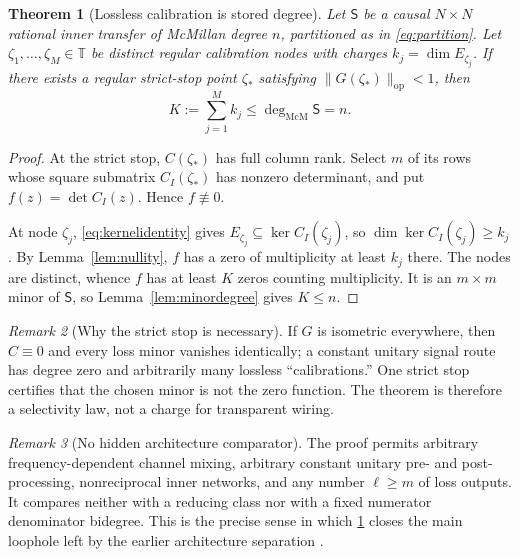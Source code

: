 \documentclass[11pt]{article}
\newtheorem{theorem}{Theorem}[section]
\theoremstyle{definition}
\theoremstyle{remark}
\newtheorem{remark}[theorem]{Remark}
\newcommand{\T}{\mathbb{T}}
\newcommand{\op}{\mathrm{op}}
\newcommand{\mcdeg}{\deg_{\mathrm{McM}}}
\begin{document}
\begin{theorem}[Lossless calibration is stored degree]
\label{thm:charge}
Let $\mathsf S$ be a causal $N\times N$ rational inner transfer of McMillan
degree $n$, partitioned as in \eqref{eq:partition}.  Let
$\zeta_1,\ldots,\zeta_M\in\T$ be distinct regular calibration nodes with
charges $k_j=\dim E_{\zeta_j}$.  If there exists a regular strict-stop point
$\zeta_*$ satisfying $\|G(\zeta_*)\|_{\op}<1$, then
\begin{equation}\label{eq:chargebound}
 K:=\sum_{j=1}^M k_j\leq \mcdeg\mathsf S=n.
\end{equation}
\end{theorem}

\begin{proof}
At the strict stop, $C(\zeta_*)$ has full column rank.  Select $m$ of its rows
whose square submatrix $C_I(\zeta_*)$ has nonzero determinant, and put
$f(z)=\det C_I(z)$.  Hence $f\not\equiv0$.

At node $\zeta_j$, \eqref{eq:kernelidentity} gives
$E_{\zeta_j}\subseteq\ker C_I(\zeta_j)$, so
$\dim\ker C_I(\zeta_j)\geq k_j$.  By Lemma~\ref{lem:nullity}, $f$ has a zero of
multiplicity at least $k_j$ there.  The nodes are distinct, whence $f$ has at
least $K$ zeros counting multiplicity.  It is an $m\times m$ minor of
$\mathsf S$, so Lemma~\ref{lem:minordegree} gives $K\leq n$.
\end{proof}

\begin{remark}[Why the strict stop is necessary]
If $G$ is isometric everywhere, then $C\equiv0$ and every loss minor vanishes
identically; a constant unitary signal route has degree zero and arbitrarily
many lossless ``calibrations.''  One strict stop certifies that the chosen
minor is not the zero function.  The theorem is therefore a selectivity law,
not a charge for transparent wiring.
\end{remark}

\begin{remark}[No hidden architecture comparator]
The proof permits arbitrary frequency-dependent channel mixing, arbitrary
constant unitary pre- and post-processing, nonreciprocal inner networks, and
any number $\ell\geq m$ of loss outputs.  It compares neither with a reducing
class nor with a fixed numerator denominator bidegree.  This is the precise
sense in which \cref{thm:charge} closes the main loophole left by the earlier
architecture separation \cite{ErikssonReservoir2026}.
\end{remark}
\end{document}
